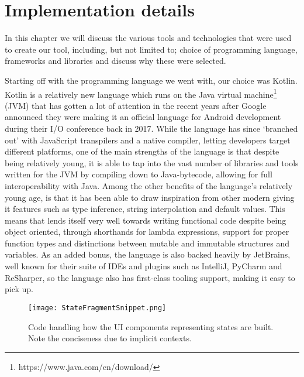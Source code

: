 \section{Implementation details}\label{sec:impl}

In this chapter we will discuss the various tools and technologies that were used to create our tool, including, but not limited to; choice of programming language, frameworks and libraries and discuss why these were selected.

Starting off with the programming language we went with, our choice was Kotlin. Kotlin is a relatively new language which runs on the Java virtual machine\footnote{https://www.java.com/en/download/} (JVM) that has gotten a lot of attention in the recent years after Google announced they were making it an official language for Android development during their I/O conference back in 2017\cite{KotlinGoogleIO2017}. While the language has since `branched out' with JavaScript transpilers and a native compiler, letting developers target different platforms, one of the main strengths of the language is that despite being relatively young, it is able to tap into the vast number of libraries and tools written for the JVM by compiling down to Java-bytecode, allowing for full interoperability with Java. Among the other benefits of the language's relatively young age, is that it has been able to draw inspiration from other modern giving it features such as type inference, string interpolation and default values. This means that lends itself very well towards writing functional code despite being object oriented, through shorthands for lambda expressions, support for proper function types and distinctions between mutable and immutable structures and variables. As an added bonus, the language is also backed heavily by JetBrains, well known for their suite of IDEs and plugins such as IntelliJ, PyCharm and ReSharper, so the language also has first-class tooling support, making it easy to pick up. 

\begin{figure}[h]
	\texttt{[image: StateFragmentSnippet.png]}
	\caption{Code handling how the UI components representing states are built. Note the conciseness due to implicit contexts.}
	\label{fig:StatFragSnip}
\end{figure}

